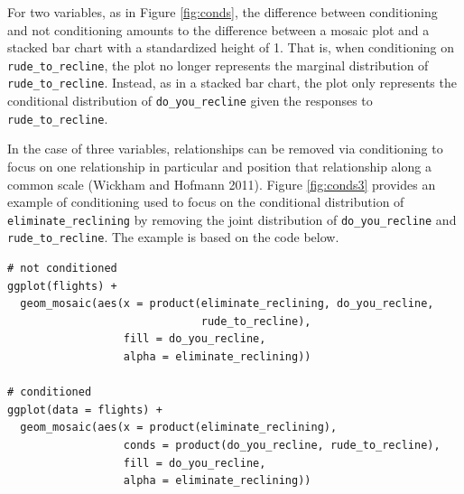 For two variables, as in Figure \ref{fig:conds}, the difference between conditioning and not conditioning amounts to the difference between a mosaic plot and a stacked bar chart with a standardized height of 1. That is, when conditioning on \texttt{rude\_to\_recline}, the plot no longer represents the marginal distribution of \texttt{rude\_to\_recline}. Instead, as in a stacked bar chart, the plot only represents the conditional distribution of \texttt{do\_you\_recline} given the responses to \texttt{rude\_to\_recline}.

In the case of three variables, relationships can be removed via conditioning to focus on one relationship in particular and position that relationship along a common scale (Wickham and Hofmann 2011). Figure \ref{fig:conds3} provides an example of conditioning used to focus on the conditional distribution of \texttt{eliminate\_reclining} by removing the joint distribution of \texttt{do\_you\_recline} and \texttt{rude\_to\_recline}. The example is based on the code below.

\begin{verbatim}
# not conditioned
ggplot(flights) +
  geom_mosaic(aes(x = product(eliminate_reclining, do_you_recline,
                              rude_to_recline), 
                  fill = do_you_recline, 
                  alpha = eliminate_reclining))

# conditioned 
ggplot(data = flights) +
  geom_mosaic(aes(x = product(eliminate_reclining), 
                  conds = product(do_you_recline, rude_to_recline), 
                  fill = do_you_recline, 
                  alpha = eliminate_reclining))
\end{verbatim}

